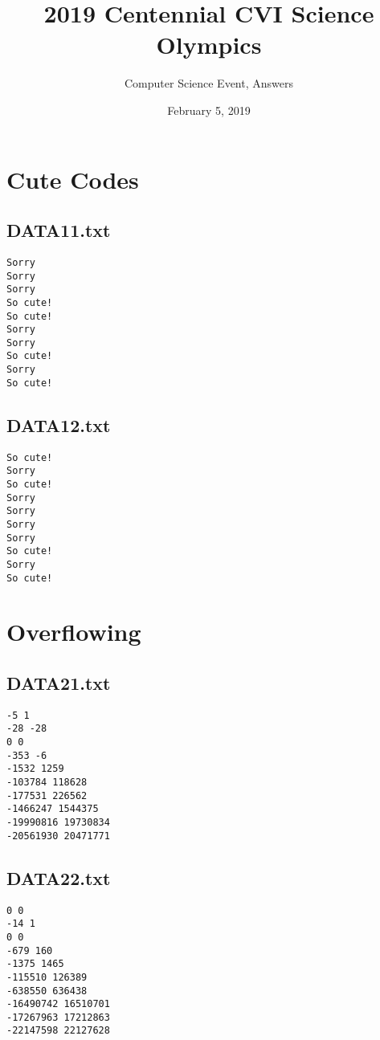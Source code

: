 \documentclass{article}
\title{2019 Centennial CVI Science Olympics}
\author{Computer Science Event, Answers}
\date{February 5, 2019}
\begin{document}
\maketitle


\pagebreak


\LARGE

\section{Cute Codes}

\subsection{DATA11.txt}

\begin{verbatim}
Sorry
Sorry
Sorry
So cute!
So cute!
Sorry
Sorry
So cute!
Sorry
So cute!
\end{verbatim}

\subsection{DATA12.txt}

\begin{verbatim}
So cute!
Sorry
So cute!
Sorry
Sorry
Sorry
Sorry
So cute!
Sorry
So cute!
\end{verbatim}


\pagebreak


\section{Overflowing}

\subsection{DATA21.txt}

\begin{verbatim}
-5 1
-28 -28
0 0
-353 -6
-1532 1259
-103784 118628
-177531 226562
-1466247 1544375
-19990816 19730834
-20561930 20471771
\end{verbatim}

\subsection{DATA22.txt}

\begin{verbatim}
0 0
-14 1
0 0
-679 160
-1375 1465
-115510 126389
-638550 636438
-16490742 16510701
-17267963 17212863
-22147598 22127628
\end{verbatim}
\end{document}
